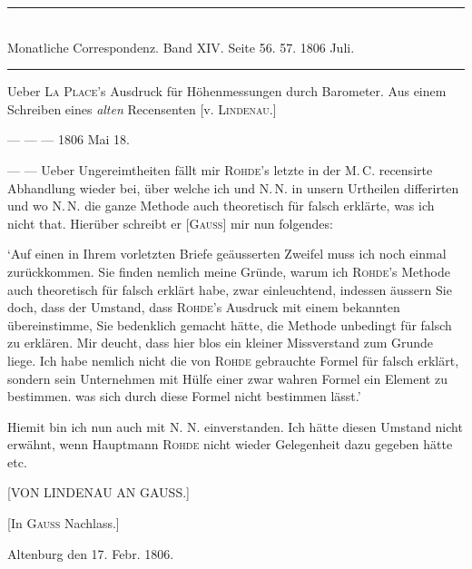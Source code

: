 \clearpage
{}
\hypertarget{native-490-lower}{}
\label{native-490-lower}
\begin{center}
\rule{0.55\linewidth}{0.4pt}\\[2pt]
Monatliche Correspondenz. Band XIV. Seite 56. 57. 1806 Juli.\\[2pt]
\rule{0.55\linewidth}{0.4pt}
\end{center}

\begin{center}
Ueber \textsc{La Place}'s Ausdruck für Höhenmessungen durch Barometer. Aus einem Schreiben eines \emph{alten} Recensenten [v. \textsc{Lindenau}.]
\end{center}

\begin{flushright}
--- --- --- 1806 Mai 18.
\end{flushright}

--- --- Ueber Ungereimtheiten fällt mir \textsc{Rohde}'s letzte in der M.\,C. recensirte Abhandlung wieder bei, über welche ich und N.\,N. in unsern Urtheilen differirten und wo N.\,N. die ganze Methode auch theoretisch für falsch erklärte, was ich nicht that. Hierüber schreibt er [\textsc{Gauss}] mir nun folgendes:

`Auf einen in Ihrem vorletzten Briefe geäusserten Zweifel muss ich noch einmal zurückkommen. Sie finden nemlich meine Gründe, warum ich \textsc{Rohde}'s Methode auch theoretisch für falsch erklärt habe, zwar einleuchtend, indessen äussern Sie doch, dass der Umstand, dass \textsc{Rohde}'s Ausdruck mit einem bekannten übereinstimme, Sie bedenklich gemacht hätte, die Methode unbedingt für falsch zu erklären.
Mir deucht, dass hier blos ein kleiner Missverstand zum Grunde liege. Ich habe nemlich nicht die von \textsc{Rohde} gebrauchte Formel für falsch erklärt, sondern sein Unternehmen mit Hülfe einer zwar wahren Formel ein Element zu bestimmen. was sich durch diese Formel nicht bestimmen lässt.'

Hiemit bin ich nun auch mit N. N. einverstanden. Ich hätte diesen Umstand nicht erwähnt, wenn Hauptmann \textsc{Rohde} nicht wieder Gelegenheit dazu gegeben hätte etc.

\clearpage
\hypertarget{native-491-lindenau}{}
\label{native-491-lindenau}
\begin{center}
[VON LINDENAU AN GAUSS.]

[In \textsc{Gauss} Nachlass.]
\end{center}

\begin{flushright}Altenburg den 17. Febr. 1806.\end{flushright}


